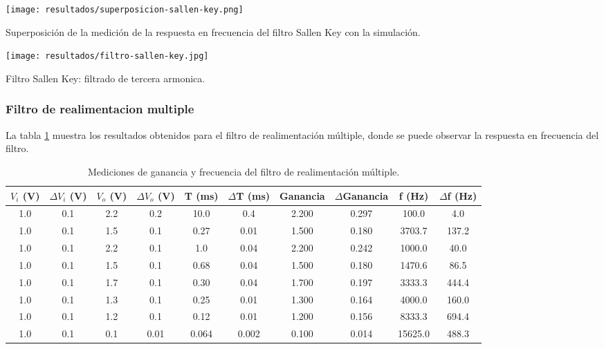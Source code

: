\begin{ilustracion}[h!]
    \centering
    \texttt{[image: resultados/superposicion-sallen-key.png]}
    \caption{Superposición de la medición de la respuesta en frecuencia del filtro Sallen Key con la simulación.}
    \label{ilus:filtro-sallen-key-superposicion}
\end{ilustracion}




\begin{ilustracion}[h!]
    \centering
    \texttt{[image: resultados/filtro-sallen-key.jpg]}
    \caption{Filtro Sallen Key: filtrado de tercera armonica.}
    \label{ilus:filtro-sallen-key}
\end{ilustracion}



\subsubsection{Filtro de realimentacion multiple}

La tabla \ref{tab:filtro-realimentacion-multiple-ganancia-frecuencia} muestra los resultados obtenidos para el filtro de realimentación múltiple, donde se puede observar la respuesta en frecuencia del filtro.

\begin{table}[h!]
    \centering
    \begin{tabular}{|c|c|c|c|c|c|c|c|c|c|}
        \hline
        $V_i$ (V) & $\Delta V_i$ (V) & $V_o$ (V) & $\Delta V_o$ (V) & T (ms) & $\Delta$T (ms) & Ganancia & $\Delta$Ganancia & f (Hz) & $\Delta$f (Hz) \\
        \hline
        1.0 & 0.1 & 2.2 & 0.2 & 10.0 & 0.4 & 2.200 & 0.297 & 100.0 & 4.0 \\
        1.0 & 0.1 & 1.5 & 0.1 & 0.27 & 0.01 & 1.500 & 0.180 & 3703.7 & 137.2 \\
        1.0 & 0.1 & 2.2 & 0.1 & 1.0 & 0.04 & 2.200 & 0.242 & 1000.0 & 40.0 \\
        1.0 & 0.1 & 1.5 & 0.1 & 0.68 & 0.04 & 1.500 & 0.180 & 1470.6 & 86.5 \\
        1.0 & 0.1 & 1.7 & 0.1 & 0.30 & 0.04 & 1.700 & 0.197 & 3333.3 & 444.4 \\
        1.0 & 0.1 & 1.3 & 0.1 & 0.25 & 0.01 & 1.300 & 0.164 & 4000.0 & 160.0 \\
        1.0 & 0.1 & 1.2 & 0.1 & 0.12 & 0.01 & 1.200 & 0.156 & 8333.3 & 694.4 \\
        1.0 & 0.1 & 0.1 & 0.01 & 0.064 & 0.002 & 0.100 & 0.014 & 15625.0 & 488.3 \\
        \hline
    \end{tabular}
    \caption{Mediciones de ganancia y frecuencia del filtro de realimentación múltiple.}
    \label{tab:filtro-realimentacion-multiple-ganancia-frecuencia}
\end{table}

